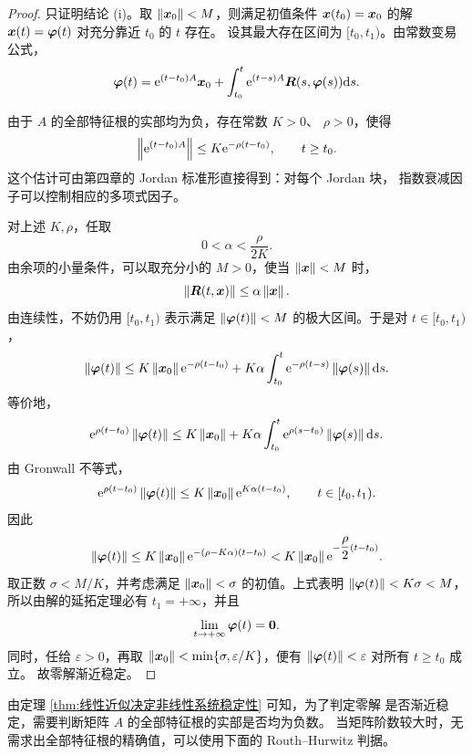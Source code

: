 \begin{proof}
	只证明结论 \textnormal{(i)}。取
	$\left\| \boldsymbol{x}_0 \right\|<M$，则满足初值条件
	$\boldsymbol{x}(t_0)=\boldsymbol{x}_0$ 的解
	$\boldsymbol{x}(t)=\boldsymbol{\varphi}(t)$ 对充分靠近 $t_0$ 的 $t$ 存在。
	设其最大存在区间为 $[t_0,t_1)$。由常数变易公式，
	\[
		\boldsymbol{\varphi}(t)
		=\mathrm{e}^{(t-t_0)A}\boldsymbol{x}_0
		+\int_{t_0}^t
		\mathrm{e}^{(t-s)A}
		\boldsymbol{R}(s,\boldsymbol{\varphi}(s))\mathrm{d} s.
	\]

	由于 $A$ 的全部特征根的实部均为负，存在常数 $K>0$、
	$\rho>0$，使得
	\[
		\left\| \mathrm{e}^{(t-t_0)A} \right\|
		\leq K\mathrm{e}^{-\rho(t-t_0)},
		\qquad t\geq t_0.
	\]
	这个估计可由第四章的 Jordan 标准形直接得到：对每个 Jordan 块，
	指数衰减因子可以控制相应的多项式因子。

	对上述 $K,\rho$，任取
	\[
		0<\alpha<\dfrac{\rho}{2K}.
	\]
	由余项的小量条件，可以取充分小的 $M>0$，使当
	$\left\| \boldsymbol{x} \right\|<M$ 时，
	\[
		\left\| \boldsymbol{R}(t,\boldsymbol{x}) \right\|
		\leq\alpha\left\| \boldsymbol{x} \right\|.
	\]
	由连续性，不妨仍用 $[t_0,t_1)$ 表示满足
	$\left\| \boldsymbol{\varphi}(t) \right\|<M$ 的极大区间。于是对
	$t\in[t_0,t_1)$，
	\[
		\left\| \boldsymbol{\varphi}(t) \right\|
		\leq K\left\| \boldsymbol{x}_0 \right\|\mathrm{e}^{-\rho(t-t_0)}
		+K\alpha\int_{t_0}^t
		\mathrm{e}^{-\rho(t-s)}
		\left\| \boldsymbol{\varphi}(s) \right\|\mathrm{d} s.
	\]
	等价地，
	\[
		\mathrm{e}^{\rho(t-t_0)}\left\| \boldsymbol{\varphi}(t) \right\|
		\leq K\left\| \boldsymbol{x}_0 \right\|
		+K\alpha\int_{t_0}^t
		\mathrm{e}^{\rho(s-t_0)}
		\left\| \boldsymbol{\varphi}(s) \right\|\mathrm{d} s.
	\]
	由 Gronwall 不等式，
	\[
		\mathrm{e}^{\rho(t-t_0)}\left\| \boldsymbol{\varphi}(t) \right\|
		\leq K\left\| \boldsymbol{x}_0 \right\|
		\mathrm{e}^{K\alpha(t-t_0)},
		\qquad t\in[t_0,t_1).
	\]
	因此
	\[
		\left\| \boldsymbol{\varphi}(t) \right\|
		\leq K\left\| \boldsymbol{x}_0 \right\|
		\mathrm{e}^{-(\rho-K\alpha)(t-t_0)}
		<K\left\| \boldsymbol{x}_0 \right\|
		\mathrm{e}^{-\dfrac{\rho}{2}(t-t_0)}.
	\]
	取正数 $\sigma<M/K$，并考虑满足
	$\left\| \boldsymbol{x}_0 \right\|<\sigma$ 的初值。上式表明
	$\left\| \boldsymbol{\varphi}(t) \right\|<K\sigma<M$，所以由解的延拓定理必有
	$t_1=+\infty$，并且
	\[
		\lim_{t\to+\infty}\boldsymbol{\varphi}(t)=\boldsymbol{0}.
	\]
	同时，任给 $\varepsilon>0$，再取
	$\left\| \boldsymbol{x}_0 \right\|<\min\{\sigma,\varepsilon/K\}$，便有
	$\left\| \boldsymbol{\varphi}(t) \right\|<\varepsilon$ 对所有 $t\geq t_0$ 成立。
	故零解渐近稳定。
\end{proof}

由定理 \ref{thm:线性近似决定非线性系统稳定性} 可知，为了判定零解
是否渐近稳定，需要判断矩阵 $A$ 的全部特征根的实部是否均为负数。
当矩阵阶数较大时，无需求出全部特征根的精确值，可以使用下面的
Routh--Hurwitz 判据。

